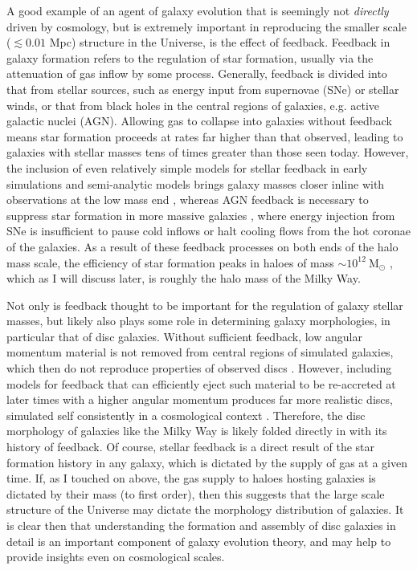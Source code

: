 A good example of an agent of galaxy evolution that is seemingly not \emph{directly} driven by cosmology, but is extremely important in reproducing the smaller scale ($\lesssim 0.01$ Mpc) structure in the Universe, is the effect of feedback. Feedback in galaxy formation refers to the regulation of star formation, usually via the attenuation of gas inflow by some process. Generally, feedback is divided into that from stellar sources, such as energy input from supernovae (SNe) or stellar winds, or that from black holes in the central regions of galaxies, e.g. active galactic nuclei (AGN). Allowing gas to collapse into galaxies without feedback means star formation proceeds at rates far higher than that observed, leading to galaxies with stellar masses tens of times greater than those seen today. However, the inclusion of even relatively simple models for stellar feedback in early simulations and semi-analytic models brings galaxy masses closer inline with observations at the low mass end  \citep[$M\lesssim 10^{12}\ \mathrm{M_\odot}$ e.g.][]{1996ApJS..105...19K,1999MNRAS.310.1087S,2003MNRAS.339..312S}, whereas AGN feedback is necessary to suppress star formation in more massive galaxies \citep[$M\gtrsim 10^{12}\ \mathrm{M_\odot}$][]{2006MNRAS.370..645B,2008MNRAS.391..481S}, where energy injection from SNe is insufficient to pause cold inflows or halt cooling flows from the hot coronae of the galaxies. As a result of these feedback processes on both ends of the halo mass scale, the efficiency of star formation peaks in haloes of mass $\sim 10^{12}\ \mathrm{M_\odot}$ \citep[e.g.][]{2013ApJ...770...57B}, which as I will discuss later, is roughly the halo mass of the Milky Way. 

Not only is feedback thought to be important for the regulation of galaxy stellar masses, but likely also plays some role in determining galaxy morphologies, in particular that of disc galaxies. Without sufficient feedback, low angular momentum material is not removed from central regions of simulated galaxies, which then do not reproduce properties of observed discs \citep[e.g.][and references therein]{2010MNRAS.408..812S}. However, including models for feedback that can efficiently eject such material to be re-accreted at later times with a higher angular momentum produces far more realistic discs, simulated self consistently in a cosmological context \citep[e.g.][]{2011MNRAS.415.1051B,2012MNRAS.427..379M,2013MNRAS.428..129S}. Therefore, the disc morphology of galaxies like the Milky Way is likely folded directly in with its history of feedback. Of course, stellar feedback is a direct result of the star formation history in any galaxy, which is dictated by the supply of gas at a given time. If, as I touched on above, the gas supply to haloes hosting galaxies is dictated by their mass (to first order), then this suggests that the large scale structure of the Universe may dictate the morphology distribution of galaxies. It is clear then that understanding the formation and assembly of disc galaxies in detail is an important component of galaxy evolution theory, and may help to provide insights even on cosmological scales.

